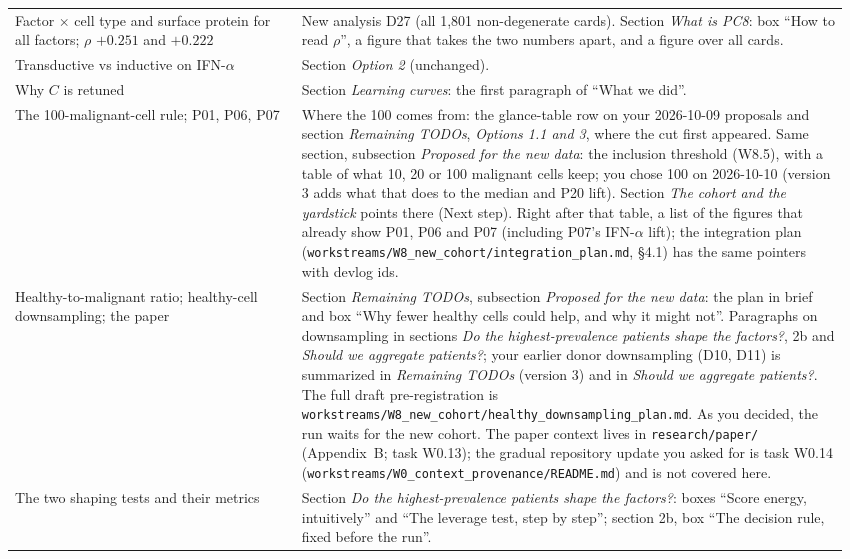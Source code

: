 \documentclass[11pt]{article}
\begin{document}
{\begin{longtable}{@{}>{\raggedright\arraybackslash}p{0.33\linewidth} >{\raggedright\arraybackslash}p{0.635\linewidth}@{}}
08 Factor $\times$ cell type and surface protein for all factors; $\rho$ $+0.251$ and $+0.222$ & New analysis D27 (all 1,801 non-degenerate cards). Section \emph{What is PC8}: box ``How to read $\rho$'', a figure that takes the two numbers apart, and a figure over all cards. \\
09 Transductive vs inductive on IFN-$\alpha$ & Section \emph{Option 2} (unchanged). \\
10 Why $C$ is retuned & Section \emph{Learning curves}: the first paragraph of ``What we did''. \\
11 The 100-malignant-cell rule; P01, P06, P07 & Where the 100 comes from: the glance-table row on your 2026-10-09 proposals and section \emph{Remaining TODOs}, \emph{Options 1.1 and 3}, where the cut first appeared. Same section, subsection \emph{Proposed for the new data}: the inclusion threshold (W8.5), with a table of what 10, 20 or 100 malignant cells keep; you chose 100 on 2026-10-10 (version 3 adds what that does to the median and P20 lift). Section \emph{The cohort and the yardstick} points there (Next step). Right after that table, a list of the figures that already show P01, P06 and P07 (including P07's IFN-$\alpha$ lift); the integration plan (\texttt{workstreams/\allowbreak W8\_new\_cohort/\allowbreak integration\_plan.md}, \S4.1) has the same pointers with devlog ids. \\
12 Healthy-to-malignant ratio; healthy-cell downsampling; the paper & Section \emph{Remaining TODOs}, subsection \emph{Proposed for the new data}: the plan in brief and box ``Why fewer healthy cells could help, and why it might not''. Paragraphs on downsampling in sections \emph{Do the highest-prevalence patients shape the factors?}, 2b and \emph{Should we aggregate patients?}; your earlier donor downsampling (D10, D11) is summarized in \emph{Remaining TODOs} (version 3) and in \emph{Should we aggregate patients?}. The full draft pre-registration is \texttt{workstreams/\allowbreak W8\_new\_cohort/\allowbreak healthy\_downsampling\_plan.md}. As you decided, the run waits for the new cohort. The paper context lives in \texttt{research/paper/} (Appendix~B; task W0.13); the gradual repository update you asked for is task W0.14 (\texttt{workstreams/\allowbreak W0\_context\_provenance/\allowbreak README.md}) and is not covered here. \\
13 The two shaping tests and their metrics & Section \emph{Do the highest-prevalence patients shape the factors?}: boxes ``Score energy, intuitively'' and ``The leverage test, step by step''; section 2b, box ``The decision rule, fixed before the run''. \\

\end{longtable}}
\end{document}
